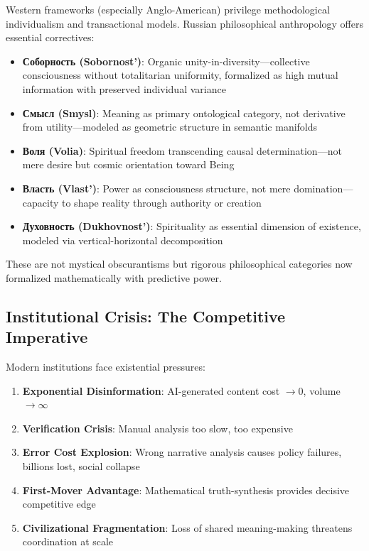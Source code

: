 \documentclass[11pt,a4paper]{article}
\theoremstyle{definition}
\theoremstyle{remark}
\begin{document}
Western frameworks (especially Anglo-American) privilege methodological individualism and transactional models. Russian philosophical anthropology offers essential correctives:

\begin{itemize}[leftmargin=*]
\item \textbf{Соборность (Sobornost')}: Organic unity-in-diversity—collective consciousness without totalitarian uniformity, formalized as high mutual information with preserved individual variance
\item \textbf{Смысл (Smysl)}: Meaning as primary ontological category, not derivative from utility—modeled as geometric structure in semantic manifolds
\item \textbf{Воля (Volia)}: Spiritual freedom transcending causal determination—not mere desire but cosmic orientation toward Being
\item \textbf{Власть (Vlast')}: Power as consciousness structure, not mere domination—capacity to shape reality through authority or creation
\item \textbf{Духовность (Dukhovnost')}: Spirituality as essential dimension of existence, modeled via vertical-horizontal decomposition
\end{itemize}

These are not mystical obscurantisms but rigorous philosophical categories now formalized mathematically with predictive power.

\subsection{Institutional Crisis: The Competitive Imperative}

Modern institutions face existential pressures:

\begin{enumerate}[label=\textbf{\arabic*.}]
\item \textbf{Exponential Disinformation}: AI-generated content cost \(\rightarrow 0\), volume \(\rightarrow \infty\)
\item \textbf{Verification Crisis}: Manual analysis too slow, too expensive
\item \textbf{Error Cost Explosion}: Wrong narrative analysis causes policy failures, billions lost, social collapse
\item \textbf{First-Mover Advantage}: Mathematical truth-synthesis provides decisive competitive edge
\item \textbf{Civilizational Fragmentation}: Loss of shared meaning-making threatens coordination at scale
\end{enumerate}
\end{document}

